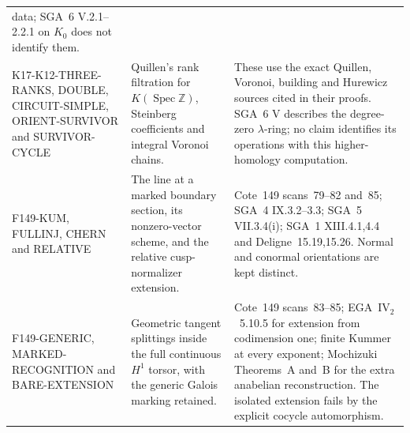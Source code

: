 \begin{longtable}{>{\raggedright\arraybackslash}p{}>{\raggedright\arraybackslash}p{}>{\raggedright\arraybackslash}p{}}
data; SGA~6 V.2.1--2.2.1 on $K_0$ does not identify them.\\
K17-K12-THREE-RANKS, DOUBLE, CIRCUIT-SIMPLE,
ORIENT-SURVIVOR and SURVIVOR-CYCLE &
Quillen's rank filtration for $K(\operatorname{Spec}\mathbb Z)$,
Steinberg coefficients and integral Voronoi chains. &
These use the exact Quillen, Voronoi, building and Hurewicz sources
cited in their proofs. SGA~6 V describes the degree-zero
$\lambda$-ring; no claim identifies its operations with this
higher-homology computation.\\
F149-KUM, FULLINJ, CHERN and RELATIVE &
The line at a marked boundary section, its nonzero-vector scheme,
and the relative cusp-normalizer extension. &
Cote~149 scans~79--82 and~85; SGA~4 IX.3.2--3.3;
SGA~5 VII.3.4(i); SGA~1 XIII.4.1,4.4 and Deligne~15.19,15.26.
Normal and conormal orientations are kept distinct.\\
F149-GENERIC, MARKED-RECOGNITION and BARE-EXTENSION &
Geometric tangent splittings inside the full continuous
$H^1$ torsor, with the generic Galois marking retained. &
Cote~149 scans~83--85; EGA~$\mathrm{IV}_2$~5.10.5 for extension
from codimension one; finite Kummer at every exponent;
Mochizuki Theorems~A and~B for the extra anabelian reconstruction.
The isolated extension fails by the explicit cocycle automorphism.\\
\bottomrule
\end{longtable}
\normalsize

